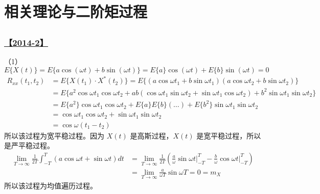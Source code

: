 \setcounter{section}{0}
\setcounter{subsection}{0}

\chapter{相关理论与二阶矩过程}

\section{}

\subsection{\hyperref[Q2014-2]{【2014-2】}}\label{A2014-2}

（1）
\begin{equation}
E\{X(t)\}=E\{a\cos(\omega t)+b\sin(\omega t)\}=E\{a\}\cos(\omega t)+E\{b\}\sin(\omega t) = 0
\tag*{}
\end{equation}
\begin{equation}
\begin{split}
R_{xx}(t_1, t_2)&=E\{X(t_1)\cdot X^*(t_2)\}=E\{(a\cos\omega t_1+b\sin\omega t_1)(a\cos\omega t_2+b\sin\omega t_2)\}\\
&=E\{a^2 \cos\omega t_1\cos\omega t_2+ab(\cos\omega t_1\sin\omega t_2+\sin\omega t_1\cos\omega t_2)+b^2\sin\omega t_1\sin\omega t_2\}\\
&=E\{a^2\}\cos\omega t_1\cos\omega t_2 + E\{a\}E\{b\}(\dots)+E\{b^2\}\sin\omega t_1\sin\omega t_2\\
&=\cos\omega t_1\cos\omega t_2+\sin\omega t_1\sin\omega t_2\\
&=\cos\omega(t_1-t_2)
\end{split}
\tag*{}
\end{equation}
所以该过程为宽平稳过程。因为 $X(t)$ 是高斯过程，$X(t)$ 是宽平稳过程，所以是严平稳过程。
\begin{equation}
\begin{split}
\lim_{T\rightarrow\infty}\frac{1}{2T}\int_{-T}^{T}(a\cos\omega t+\sin\omega t)dt&=\lim_{T\rightarrow\infty}\frac{1}{2T}(\frac{a}{\omega}\sin\omega t\biggr\rvert_{-T}^{T}-\frac{b}{\omega}\cos\omega t\biggr\rvert_{-T}^T)\\
&=\lim_{T\rightarrow\infty}\frac{a}{\omega T}\sin\omega T=0=m_X
\end{split}
\tag*{}
\end{equation}
所以该过程为均值遍历过程。

